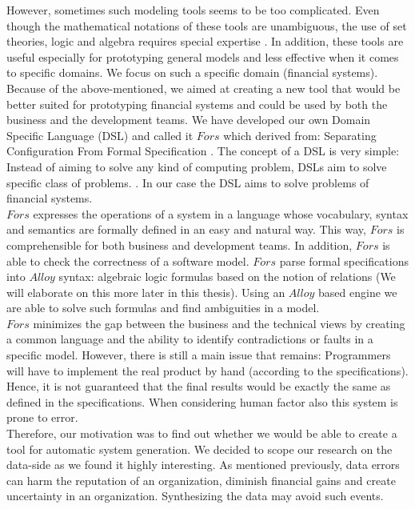 \documentclass[oneside]{book}
\begin{document}
However, sometimes such modeling tools seems to be too complicated. Even though the mathematical notations of these tools are unambiguous, the use of set theories, logic and algebra requires special expertise \cite[p.~10]{fors}. In addition, these tools are useful especially for prototyping general models and less effective when it comes to specific domains. We focus on such a specific domain (financial systems). \\

Because of the above-mentioned, we aimed at creating a new tool that would be better suited for prototyping financial systems and could be used by both the business and the development teams. We have developed our own Domain Specific Language (DSL) and called it $Fors$ which derived from: Separating Configuration From Formal Specification \cite{fors}. The concept of a DSL is very simple: Instead of aiming to solve any kind of computing problem, DSLs aim to solve specific class of problems. \cite{dsl}. In our case the DSL aims to solve problems of financial systems.  \\

$Fors$ expresses the operations of a system in a language whose vocabulary, syntax and semantics are formally defined in an easy and natural way. This way, $Fors$ is comprehensible for both business and development teams. In addition, $Fors$ is able to check the correctness of a software model. $Fors$ parse formal specifications into $Alloy$ syntax: algebraic logic formulas based on the notion of relations (We will elaborate on this more later in this thesis). Using an $Alloy$ based engine we are able to solve such formulas and find ambiguities in a model. \\

$Fors$ minimizes the gap between the business and the technical views by creating a common language and the ability to identify contradictions or faults in a specific model. However, there is still a main issue that remains: Programmers will have to implement the real product by hand (according to the specifications). Hence, it is not guaranteed that the final results would be exactly the same as defined in the specifications. When considering human factor also this system  is prone to error. \\

Therefore, our motivation was to find out whether we would be able to create a tool for automatic system generation. We decided to scope our research on the data-side as we found it highly interesting. As mentioned previously, data errors can harm the reputation of an organization, diminish financial gains and create uncertainty  in an organization. Synthesizing the data may avoid such events.\\
\end{document}
